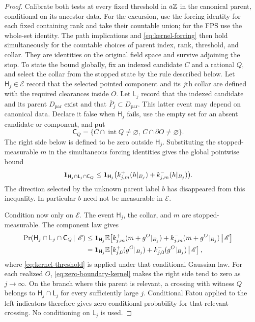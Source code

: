 \begin{proof}
Calibrate both tests at every fixed threshold in \(a\mathbb Z\) in the
canonical parent, conditional on its ancestor data. For the excursion,
use the forcing identity for each fixed containing rank and take their
countable union; for the FPS use the whole-set identity. The path
implications and \eqref{eq:kernel-forcing} then hold simultaneously
for the countable choices of parent index, rank, threshold, and collar.
They are identities on the original field space and survive adjoining
the stop. To state the bound globally, fix an indexed candidate \(C\)
and a rational \(Q\), and select the collar from the stopped state by
the rule described below. Let \(\mathsf H_j\in\mathscr E\) record that
the selected pointed component and its \(j\)th collar are defined with
the required clearances inside \(O\). Let \(\mathsf L_j\) record that
the indexed candidate and its parent \(D_{\mathrm{par}}\) exist and that
\(\overline P_j\subset D_{\mathrm{par}}\). This latter event may depend
on canonical data. Declare it false when \(\mathsf H_j\) fails, use the
empty set for an absent candidate or component, and put
\[
 \mathsf C_Q=\{C\cap\operatorname{int}Q\ne\varnothing,\,
                     C\cap\partial O\ne\varnothing\}.
\]
The right side below is defined to be zero outside \(\mathsf H_j\).
Substituting the stopped-measurable \(m\) in the simultaneous forcing
identities gives the global pointwise bound
\begin{equation}
 \mathbf 1_{\mathsf H_j\cap\mathsf L_j\cap\mathsf C_Q}
 \le \mathbf 1_{\mathsf H_j}
       \bigl(k_{j,m}^{+}(h|_{B_j})+k_{j,m}^{-}(h|_{B_j})\bigr).
 \label{eq:crossing-kernel-bound}
\end{equation}
The direction selected by the unknown parent label \(b\) has disappeared
from this inequality. In particular \(b\) need not be measurable in
\(\mathscr E\).

Condition now only on \(\mathscr E\). The event \(\mathsf H_j\), the
collar, and \(m\) are stopped-measurable. The component law gives
\begin{align*}
 \Pr(\mathsf H_j\cap\mathsf L_j\cap\mathsf C_Q\mid\mathscr E)
 &\le \mathbf 1_{\mathsf H_j}\mathbb E\!\left[
   k_{j,m}^{+}(m+g^O|_{B_j})+
   k_{j,m}^{-}(m+g^O|_{B_j})\,\middle|\,\mathscr E\right]
 \\&=
 \mathbf 1_{\mathsf H_j}\mathbb E\!\left[
   k_{j,0}^{+}(g^O|_{B_j})+
   k_{j,0}^{-}(g^O|_{B_j})\,\middle|\,\mathscr E\right],
\end{align*}
where \eqref{eq:kernel-threshold} is applied under that conditional
Gaussian law. For each realized \(O\), \eqref{eq:zero-boundary-kernel}
makes the right side tend to zero as \(j\to\infty\). On the branch where
this parent is relevant, a crossing with witness \(Q\) belongs to
\(\mathsf H_j\cap\mathsf L_j\) for every sufficiently large \(j\).
Conditional Fatou applied to the left indicators therefore gives zero
conditional probability for that relevant crossing. No conditioning
on \(\mathsf L_j\) is used.


\end{proof}
